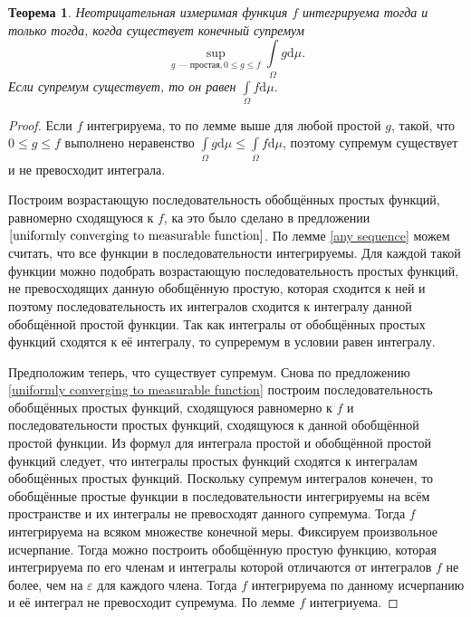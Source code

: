 \documentclass[12pt]{article}
\newtheorem{theorem}{Теорема}
\numberwithin{theorem}{section}
\theoremstyle{definition}
\newcommand{\diff}{\mathrm{d}}
\begin{document}
	\begin{theorem}
		Неотрицательная измеримая функция $ f $ интегрируема тогда и только тогда, когда
		существует конечный супремум
		$$ \sup\limits_{g \text{ --- простая}, 0 \leqslant g \leqslant f} \int\limits_{\Omega} g\diff\mu. $$
		Если супремум существует, то он равен $ \int\limits_{\Omega} f\diff\mu $.
	\end{theorem}
	
	\begin{proof}
		Если $ f $ интегрируема, то по лемме выше для любой простой $ g $, такой, что
		$ 0 \leqslant g \leqslant f $ выполнено неравенство
		$ \int\limits_{\Omega} g\diff\mu \leqslant \int\limits_{\Omega} f\diff\mu $,
		поэтому супремум существует и не превосходит интеграла.
		
		Построим возрастающую последовательность обобщённых простых функций, равномерно сходящуюся к $ f $, 
		ка это было сделано в предложении $ \ref{uniformly converging to measurable function} $.
		По лемме \ref{any sequence} можем считать, что все функции в последовательности интегрируемы.
		Для каждой такой функции можно подобрать возрастающую последовательность простых функций, 
		не превосходящих данную обобщённую простую, которая сходится
		к ней и поэтому последовательность их интегралов сходится к интегралу данной обобщённой простой функции.
		Так как интегралы от обобщённых простых функций сходятся к её интегралу,
		то супреремум в условии равен интегралу.
		
		Предположим теперь, что существует супремум. Снова по предложению \ref{uniformly converging to measurable function}
		построим последовательность обобщённых простых функций,
		сходящуюся равномерно к $ f $ и последовательности простых функций, сходящуюся к данной обобщённой простой функции.
		Из формул для интеграла простой и обобщённой простой функций следует, что интегралы простых функций сходятся
		к интегралам обобщённых простых функций. Поскольку супремум интегралов конечен,
		то обобщённые простые функции в последовательности интегрируемы на всём пространстве и их интегралы не превосходят
		данного супремума.
		Тогда $ f $ интегрируема на всяком множестве конечной меры.
		Фиксируем произвольное исчерпание. Тогда можно построить обобщённую простую функцию,
		которая интегрируема по его членам и интегралы которой отличаются от интегралов $ f $
		не более, чем на $ \varepsilon $ для каждого члена.
		Тогда $ f $ интегрируема по данному исчерпанию и её интеграл не превосходит супремума.
		По лемме $ f $ интегриуема.
	\end{proof}
	
\end{document}
